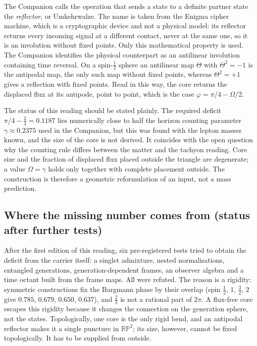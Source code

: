 The Companion calls the operation that sends a state to a definite
partner state the \emph{reflector}, or Umkehrwalze. The name is taken
from the Enigma cipher machine, which is a cryptographic device and not
a physical model: its reflector returns every incoming signal at a
different contact, never at the same one, so it is an involution
without fixed points. Only this mathematical property is used. The
Companion identifies the physical counterpart as an antilinear
involution containing time reversal. On a spin-$\tfrac12$ sphere an
antilinear map $\Theta$ with $\Theta^2=-1$ is the antipodal map, the
only such map without fixed points, whereas $\Theta^2=+1$ gives a
reflection with fixed points. Read in this way, the core returns the
displaced flux at its antipode, point to point, which is the case
$\varphi=\pi/4-\Omega/2$.

The status of this reading should be stated plainly. The required
deficit $\pi/4-\tfrac23=0.1187$ lies numerically close to half the
horizon counting parameter $\gamma\approx0.2375$ used in the Companion,
but this was found with the lepton masses known, and the size of the
core is not derived. It coincides with the open question why the
counting rule differs between the matter and the tachyon reading.
Core size and the fraction of displaced flux placed outside the
triangle are degenerate; a value $\Omega=\gamma$ holds only together
with complete placement outside. The construction is therefore a
geometric reformulation of an input, not a mass prediction.

\subsection{Where the missing number comes from (status after further tests)}

After the first edition of this reading, six pre-registered tests
tried to obtain the deficit from the carrier itself: a singlet
admixture, nested normalisations, entangled generations,
generation-dependent frames, an observer algebra and a time octant
built from the frame maps. All were refuted. The reason is a rigidity:
symmetric constructions fix the Bargmann phase by their overlap
(spin $\tfrac12$, $1$, $\tfrac32$, $2$ give $0.785$, $0.679$, $0.650$,
$0.637$), and $\tfrac23$ is not a rational part of $2\pi$. A flux-free
core escapes this rigidity because it changes the connection on the
generation sphere, not the states. Topologically, one core is the only
rigid bend, and an antipodal reflector makes it a single puncture in
$\mathbb{RP}^2$; its size, however, cannot be fixed topologically. It
has to be supplied from outside.

